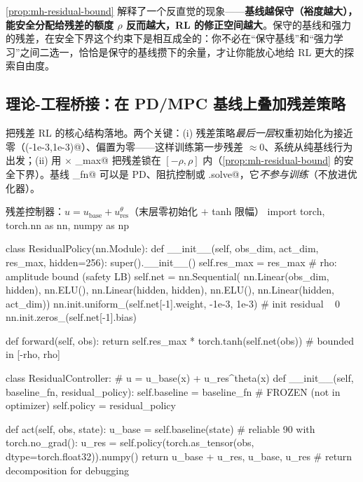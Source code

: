 \begin{insight}[保守的基线和强力的残差相互成全]
\cref{prop:mh-residual-bound} 解释了一个反直觉的现象——\textbf{基线越保守（裕度越大），能安全分配给残差的额度 $\rho$ 反而越大，RL 的修正空间越大}。保守的基线和强力的残差，在安全下界这个约束下是相互成全的：你不必在“保守基线”和“强力学习”之间二选一，恰恰是保守的基线攒下的余量，才让你能放心地给 RL 更大的探索自由度。
\end{insight}

\subsection{理论-工程桥接：在 PD/MPC 基线上叠加残差策略}
\label{sec:mh-residual-code}

把残差 RL 的核心结构落地。两个关键：(i) 残差策略\emph{最后一层}权重初始化为接近零（\verb@uniform(-1e-3,1e-3)@）、偏置为零——这样训练第一步残差 $\approx0$、系统从纯基线行为出发；(ii) 用 \verb@tanh@ $\times$ \verb@res_max@ 把残差锁在 $[-\rho,\rho]$ 内（\cref{prop:mh-residual-bound} 的安全下界）。基线 \verb@baseline_fn@ 可以是 PD、阻抗控制或 \verb@MPC.solve@，它\emph{不参与训练}（不放进优化器）。

\begin{codebox}[Python]{残差控制器：$u=u_{\text{base}}+u_{\text{res}}^{\theta}$（末层零初始化 $+$ tanh 限幅）}
import torch, torch.nn as nn, numpy as np

class ResidualPolicy(nn.Module):
    def __init__(self, obs_dim, act_dim, res_max, hidden=256):
        super().__init__()
        self.res_max = res_max                  # rho: amplitude bound (safety LB)
        self.net = nn.Sequential(
            nn.Linear(obs_dim, hidden), nn.ELU(),
            nn.Linear(hidden, hidden), nn.ELU(),
            nn.Linear(hidden, act_dim))
        nn.init.uniform_(self.net[-1].weight, -1e-3, 1e-3)   # init residual ~ 0
        nn.init.zeros_(self.net[-1].bias)

    def forward(self, obs):
        return self.res_max * torch.tanh(self.net(obs))      # bounded in [-rho, rho]

class ResidualController:                       # u = u_base(x) + u_res^theta(x)
    def __init__(self, baseline_fn, residual_policy):
        self.baseline = baseline_fn             # FROZEN (not in optimizer)
        self.policy = residual_policy

    def act(self, obs, state):
        u_base = self.baseline(state)           # reliable 90%
        with torch.no_grad():
            u_res = self.policy(torch.as_tensor(obs, dtype=torch.float32)).numpy()
        return u_base + u_res, u_base, u_res    # return decomposition for debugging
\end{codebox}

